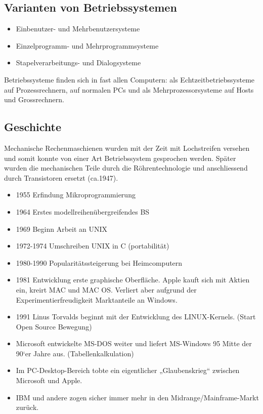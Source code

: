 \documentclass[a4paper, 10pt]{article}
\begin{document}
\subsection{Varianten von Betriebssystemen}
\begin{itemize}
\item Einbenutzer- und Mehrbenutzersysteme
\item Einzelprogramm- und Mehrprogrammsysteme
\item Stapelverarbeitungs- und Dialogsysteme
\end{itemize}
Betriebssysteme finden sich in fast allen Computern: als Echtzeitbetriebssysteme auf Prozessrechnern, auf normalen PCs und als Mehrprozessorsysteme auf Hosts und Grossrechnern.

\subsection{Geschichte}
Mechanische Rechenmaschienen wurden mit der Zeit mit Lochstreifen versehen und somit konnte von einer Art Betriebssystem gesprochen werden. Sp\"ater wurden die mechanischen Teile durch die R\"ohrentechnologie und anschliessend durch Transistoren ersetzt (ca.1947).
\begin{itemize}
\item 1955 Erfindung Mikroprogrammierung
\item 1964 Erstes modellreihen\"ubergreifendes BS
\item 1969 Beginn Arbeit an UNIX
\item 1972-1974 Umschreiben UNIX in C (portabilit\"at)
\item 1980-1990 Popularit\"atssteigerung bei Heimcomputern
\item 1981 Entwicklung erste graphische Oberfl\"ache. Apple kauft sich mit Aktien ein, kreirt MAC und MAC OS. Verliert aber aufgrund der Experimentierfreudigkeit Marktanteile an Windows.
\item 1991 Linus Torvalds beginnt mit der Entwicklung des LINUX-Kernels. (Start Open Source Bewegung)
\item Microsoft entwickelte MS-DOS weiter und liefert MS-Windows
95 Mitte der 90‘er Jahre aus. (Tabellenkalkulation)
\item Im PC-Desktop-Bereich tobte ein eigentlicher „Glaubenskrieg“ zwischen Microsoft und Apple.
\item IBM und andere zogen sicher immer mehr in den Midrange/Mainframe-Markt zur\"uck.
\end{itemize}
\end{document}
